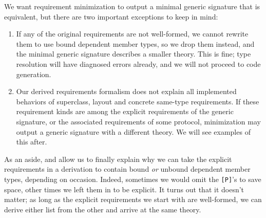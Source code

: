 \documentclass[../generics]{subfiles}
\begin{document}
We want requirement minimization to output a minimal generic signature that is equivalent, but there are two important exceptions to keep in mind:
\begin{enumerate}
\item If any of the original requirements are not well-formed, we cannot rewrite them to use bound dependent member types, so we drop them instead, and the minimal generic signature describes a smaller theory. This is fine; type resolution will have diagnosed errors already, and we will not proceed to code generation.
\item Our derived requirements formalism does not explain all implemented behaviors of superclass, layout and concrete same-type requirements. If these requirement kinds are among the explicit requirements of the generic signature, or the associated requirements of some protocol, minimization may output a generic signature with a different theory. We will see examples of this after.
\end{enumerate}

As an aside,  and  allow us to finally explain why we can take the explicit requirements in a derivation to contain bound \emph{or} unbound dependent member types, depending on occasion. Indeed, sometimes we would omit the \texttt{[P]}'s to save space, other times we left them in to be explicit. It turns out that it doesn't matter; as long as the explicit requirements we start with are well-formed, we can derive either list from the other and arrive at the same theory.
\end{document}
